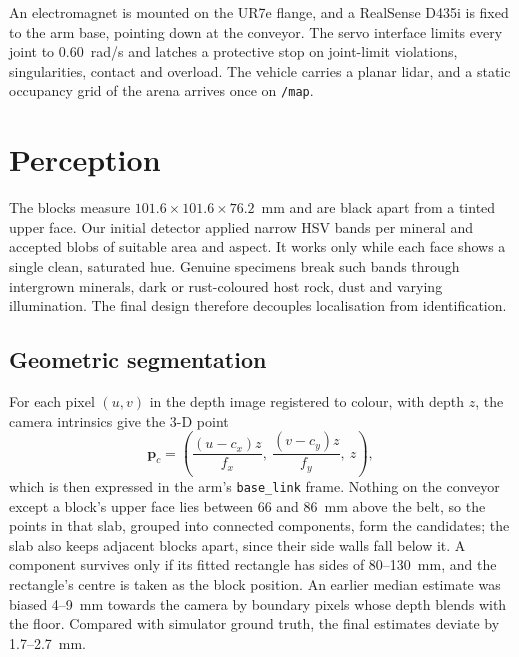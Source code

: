 \documentclass[conference]{IEEEtran}
\begin{document}
An electromagnet is mounted on the UR7e flange, and a RealSense D435i is fixed to the arm base, pointing down at the conveyor. The servo interface limits every joint to 0.60~rad/s and latches a protective stop on joint-limit violations, singularities, contact and overload. The vehicle carries a planar lidar, and a static occupancy grid of the arena arrives once on \texttt{/map}.

\section{Perception}
The blocks measure $101.6\times101.6\times76.2$~mm and are black apart from a tinted upper face. Our initial detector applied narrow HSV bands per mineral and accepted blobs of suitable area and aspect. It works only while each face shows a single clean, saturated hue. Genuine specimens break such bands through intergrown minerals, dark or rust-coloured host rock, dust and varying illumination. The final design therefore decouples localisation from identification.

\subsection{Geometric segmentation}
For each pixel $(u,v)$ in the depth image registered to colour, with depth $z$, the camera intrinsics give the 3-D point
\begin{equation}
\mathbf{p}_c = \left(\frac{(u-c_x)z}{f_x},\ \frac{(v-c_y)z}{f_y},\ z\right), \label{eq:backproj}
\end{equation}
which is then expressed in the arm's \texttt{base\_link} frame. Nothing on the conveyor except a block's upper face lies between 66 and 86~mm above the belt, so the points in that slab, grouped into connected components, form the candidates; the slab also keeps adjacent blocks apart, since their side walls fall below it. A component survives only if its fitted rectangle has sides of 80--130~mm, and the rectangle's centre is taken as the block position. An earlier median estimate was biased 4--9~mm towards the camera by boundary pixels whose depth blends with the floor. Compared with simulator ground truth, the final estimates deviate by 1.7--2.7~mm.
\end{document}
